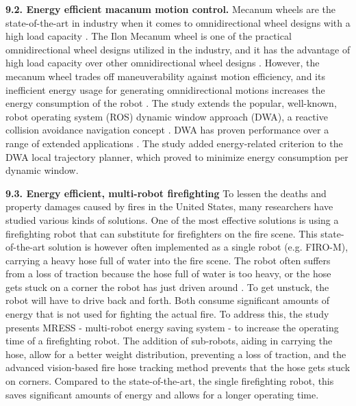 \vspace{2mm} \noindent \textbf{9.2. Energy efficient macanum motion control.}
Mecanum wheels are the state-of-the-art in industry when it comes to omnidirectional wheel designs with a high load capacity \cite{xie2018mecanum_wheel}.
The Ilon Mecanum wheel is one of the practical omnidirectional wheel designs utilized in the industry, 
and it has the advantage of high load capacity over other omnidirectional wheel designs \cite{adascalitei2011mecanum_wheels}.
However, the mecanum wheel trades off maneuverability against motion efficiency, and its inefficient energy usage for generating omnidirectional 
motions increases the energy consumption of the robot \cite{diegel2002improved_mecanum_wheel}.
The study extends the popular, well-known, robot operating system (ROS) dynamic window approach (DWA),
a reactive collision avoidance navigation concept \cite{fox1997dwa_paper}.
DWA has proven performance over a range of extended applications \cite{brock1999dwa_usage_1,ogren2005dwa_usage_2,kiss2012dwa_usage_3}.
The study added energy-related criterion to the DWA local trajectory planner,
which proved to minimize energy consumption per dynamic window.

\vspace{2mm} \noindent \textbf{9.3. Energy efficient, multi-robot firefighting}
To lessen the deaths \cite{fahy2015firefighter_deaths} and property damages \cite{karter2013fire_damages} 
caused by fires in the United States, many researchers have studied various kinds of solutions. 
One of the most effective solutions is using a firefighting robot that can 
substitute for firefighters on the fire scene. This state-of-the-art solution
is however often implemented as a single robot (e.g. FIRO-M), 
carrying a heavy hose full of water into the fire scene.
The robot often suffers from a loss of traction because the hose full of water
is too heavy, or the hose gets stuck on a corner the robot has just driven around \cite{kim2016firefighting_robot}.
To get unstuck, the robot will have to drive back and forth. 
Both consume significant amounts of energy that is not used for fighting the actual fire.
To address this, the study presents MRESS - multi-robot energy saving system - to increase
the operating time of a firefighting robot.
The addition of sub-robots, aiding in carrying the hose, 
allow for a better weight distribution, preventing a loss of traction, 
and the advanced vision-based fire hose tracking method prevents 
that the hose gets stuck on corners.
Compared to the state-of-the-art, the single firefighting robot, 
this saves significant amounts of energy and allows for a longer operating time.

